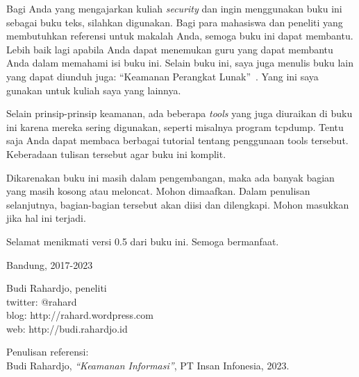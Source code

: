 Bagi Anda yang mengajarkan kuliah {\em security} dan ingin menggunakan
buku ini sebagai buku teks, silahkan digunakan.
Bagi para mahasiswa dan peneliti yang membutuhkan referensi untuk
makalah Anda, semoga buku ini dapat membantu.
Lebih baik lagi apabila Anda dapat menemukan guru yang dapat membantu Anda
dalam memahami isi buku ini.
Selain buku ini, saya juga menulis buku lain yang dapat diunduh juga:
``Keamanan Perangkat Lunak''~\cite{BRsecuresoftware}.
Yang ini saya gunakan untuk kuliah saya yang lainnya.

Selain prinsip-prinsip keamanan, ada beberapa {\em tools} yang juga diuraikan
di buku ini karena mereka sering digunakan, seperti misalnya program tcpdump.
Tentu saja Anda dapat membaca berbagai tutorial tentang penggunaan tools
tersebut. Keberadaan tulisan tersebut agar buku ini komplit.

Dikarenakan buku ini masih dalam pengembangan, maka ada banyak bagian yang
masih kosong atau meloncat. Mohon dimaafkan. Dalam penulisan selanjutnya,
bagian-bagian tersebut akan diisi dan dilengkapi. Mohon masukkan jika hal ini
terjadi.

Selamat menikmati versi 0.5 dari buku ini. Semoga bermanfaat.
\vspace{5 mm}

Bandung, 2017-2023


Budi Rahardjo, peneliti\\
twitter: @rahard\\
blog: http://rahard.wordpress.com\\
web: http://budi.rahardjo.id

\vspace{5 mm}
Penulisan referensi:\\
Budi Rahardjo, {\em ``Keamanan Informasi''}, PT Insan Infonesia, 2023.

\doclicenseThis
